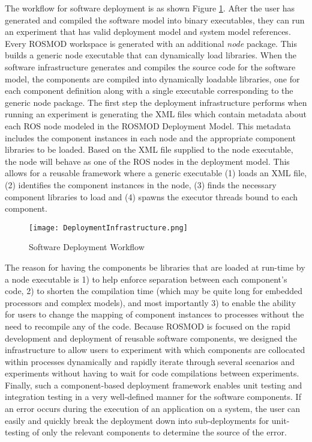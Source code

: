 The workflow for software deployment is as shown Figure
\ref{fig:workflow}. After the user has generated and compiled the
software model into binary executables, they can run an experiment
that has valid deployment model and system model references. Every
ROSMOD workspace is generated with an additional \emph{node}
package. This builds a generic node executable that can dynamically
load libraries. When the software infrastructure generates and
compiles the source code for the software model, the components are
compiled into dynamically loadable libraries, one for each component
definition along with a single executable corresponding to the generic
node package. The first step the deployment infrastructure performs
when running an experiment is generating the XML files which contain
metadata about each ROS node modeled in the ROSMOD Deployment
Model. This metadata includes the component instances in each node and the
appropriate component libraries to be loaded. Based on the XML file
supplied to the node executable, the node will behave as one of the
ROS nodes in the deployment model. This allows for a reusable
framework where a generic executable (1) loads an XML file, (2)
identifies the component instances in the node, (3) finds the
necessary component libraries to load and (4) spawns the executor
threads bound to each component.

\begin{figure}[ht]
	\centering
	\texttt{[image: DeploymentInfrastructure.png]}
	\caption{Software Deployment Workflow}
	\label{fig:workflow}
\end{figure}
\FloatBarrier

The reason for having the components be libraries that are loaded at
run-time by a node executable is 1) to help enforce separation between
each component's code, 2) to shorten the compilation time (which may
be quite long for embedded processors and complex models), and most
importantly 3) to enable the ability for users to change the mapping
of component instances to processes without the need to recompile any
of the code.  Because ROSMOD is focused on the rapid development and
deployment of reusable software components, we designed the
infrastructure to allow users to experiment with which components are
collocated within processes dynamically and rapidly iterate through
several scenarios and experiments without having to wait for code
compilations between experiments.  Finally, such a component-based
deployment framework enables unit testing and integration testing in a
very well-defined manner for the software components.  If an error
occurs during the execution of an application on a system, the user
can easily and quickly break the deployment down into sub-deployments
for unit-testing of only the relevant components to determine the
source of the error.

